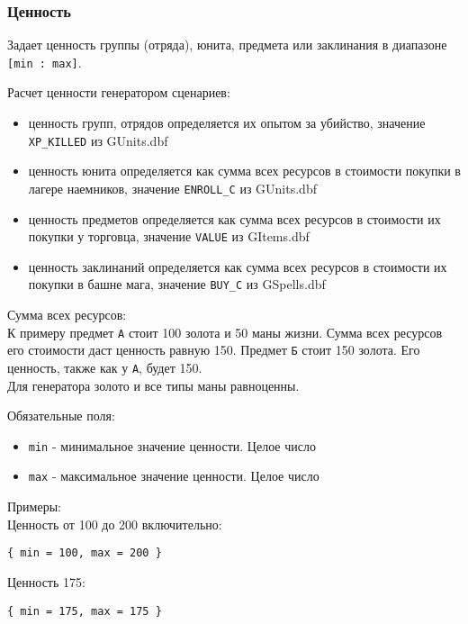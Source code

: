 \subsubsection{Ценность}
\label{value}
Задает ценность группы (отряда), юнита, предмета или заклинания в диапазоне \texttt{[min : max]}.

Расчет ценности генератором сценариев:
\begin{itemize}
\item ценность групп, отрядов определяется их опытом за убийство, значение \texttt{XP\_KILLED} из GUnits.dbf
\item ценность юнита определяется как сумма всех ресурсов в стоимости покупки в лагере наемников, значение \texttt{ENROLL\_C} из GUnits.dbf
\item ценность предметов определяется как сумма всех ресурсов в стоимости их покупки у торговца, значение \texttt{VALUE} из GItems.dbf
\item ценность заклинаний определяется как сумма всех ресурсов в стоимости их покупки в башне мага, значение \texttt{BUY\_C} из GSpells.dbf
\end{itemize}

Сумма всех ресурсов:\\
К примеру предмет \texttt{А} стоит 100 золота и 50 маны жизни. Сумма всех ресурсов его стоимости даст ценность равную 150.
Предмет \texttt{Б} стоит 150 золота. Его ценность, также как у \texttt{А}, будет 150.\\
Для генератора золото и все типы маны равноценны.

Обязательные поля:
\begin{itemize}
\item \texttt{min} - минимальное значение ценности. Целое число
\item \texttt{max} - максимальное значение ценности. Целое число
\end{itemize}

Примеры:\\
Ценность от 100 до 200 включительно:\\
\begin{lstlisting}
{ min = 100, max = 200 }
\end{lstlisting}
Ценность 175:\\
\begin{lstlisting}
{ min = 175, max = 175 }
\end{lstlisting}